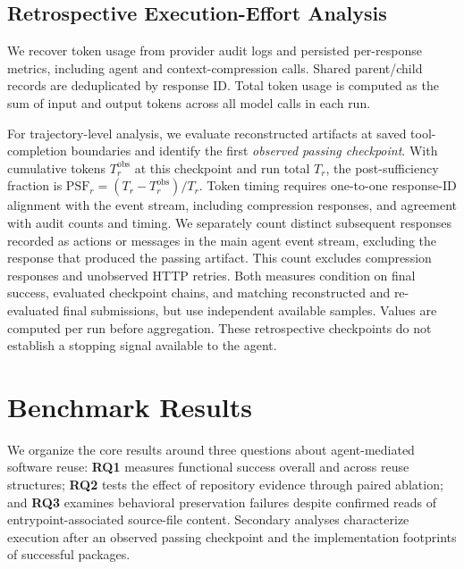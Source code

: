 \documentclass[acmsmall,screen,review,anonymous]{acmart}
\begin{document}
\subsection{Retrospective Execution-Effort Analysis}
\label{sec:execution-effort-protocol}

We recover token usage from provider audit logs and persisted per-response
metrics, including agent and context-compression calls. Shared parent/child
records are deduplicated by response ID. Total token usage is computed as the sum of input and output tokens across all
model calls in each run.

For trajectory-level analysis, we evaluate reconstructed artifacts at saved
tool-completion boundaries and identify the first \emph{observed passing
checkpoint}. With cumulative tokens $T_r^{\mathrm{obs}}$ at this checkpoint and
run total $T_r$, the post-sufficiency fraction is
$\mathrm{PSF}_r=(T_r-T_r^{\mathrm{obs}})/T_r$.
Token timing requires one-to-one response-ID alignment with the event stream,
including compression responses, and agreement with audit counts and timing.
We separately count distinct subsequent responses recorded as actions or
messages in the main agent event stream, excluding the response that produced
the passing artifact. This count
excludes compression responses and unobserved HTTP retries. Both measures
condition on final success, evaluated checkpoint chains, and matching
reconstructed and re-evaluated final submissions, but use independent available
samples. Values are computed per run before aggregation. These retrospective
checkpoints do not establish a stopping signal available to the agent.

\section{Benchmark Results}
\label{sec:results}

We organize the core results around three questions about agent-mediated
software reuse: \textbf{RQ1} measures functional success overall and across reuse
structures; \textbf{RQ2} tests the effect of repository evidence through paired
ablation; and \textbf{RQ3} examines behavioral preservation failures despite
confirmed reads of entrypoint-associated source-file content. Secondary analyses
characterize execution after an observed passing checkpoint and the
implementation footprints of successful packages.
\end{document}
